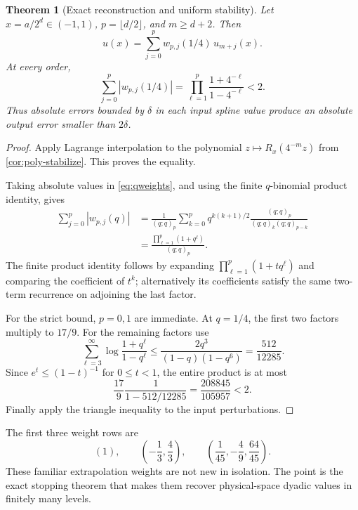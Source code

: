 \documentclass[11pt,a4paper]{article}
\numberwithin{equation}{section}
\newtheorem{theorem}{Theorem}[section]
\theoremstyle{definition}
\begin{document}
\begin{theorem}[Exact reconstruction and uniform stability]\label{thm:richardson}
Let $x=a/2^d\in(-1,1)$, $p=\lfloor d/2\rfloor$, and $m\geq d+2$.
Then
\begin{equation}
 \boxed{\quad u(x)=\sum_{j=0}^p w_{p,j}(1/4)\,u_{m+j}(x).\quad}
 \label{eq:exact-richardson}
\end{equation}
At every order,
\begin{equation}
 \sum_{j=0}^p|w_{p,j}(1/4)|
 =\prod_{\ell=1}^p\frac{1+4^{-\ell}}{1-4^{-\ell}}<2.
 \label{eq:stable-weights}
\end{equation}
Thus absolute errors bounded by $\delta$ in each input spline value
produce an absolute output error smaller than $2\delta$.
\end{theorem}
\begin{proof}
Apply Lagrange interpolation to the polynomial
$z\mapsto R_x(4^{-m}z)$ from \cref{cor:poly-stabilize}. This proves
the equality.

Taking absolute values in \eqref{eq:qweights}, and using the finite
$q$-binomial product identity, gives
\begin{align}
 \sum_{j=0}^p|w_{p,j}(q)|
 &=\frac1{(q;q)_p}\sum_{k=0}^p
      q^{k(k+1)/2}\frac{(q;q)_p}{(q;q)_k(q;q)_{p-k}}\nonumber\\
 &=\frac{\prod_{\ell=1}^p(1+q^\ell)}{(q;q)_p}.
 \label{eq:qnorm-proof}
\end{align}
The finite product identity follows by expanding
$\prod_{\ell=1}^p(1+tq^\ell)$ and comparing the coefficient of
$t^k$; alternatively its coefficients satisfy the same two-term
recurrence on adjoining the last factor.

For the strict bound, $p=0,1$ are immediate. At $q=1/4$, the first
two factors multiply to $17/9$. For the remaining factors use
\begin{equation}
 \sum_{\ell=3}^{\infty}\log\frac{1+q^\ell}{1-q^\ell}
 \leq\frac{2q^3}{(1-q)(1-q^6)}=\frac{512}{12285}.
\end{equation}
Since $e^t\leq(1-t)^{-1}$ for $0\leq t<1$, the entire product is
at most
\begin{equation}
 \frac{17}{9}\frac1{1-512/12285}
 =\frac{208845}{105957}<2.
\end{equation}
Finally apply the triangle inequality to the input perturbations.
\end{proof}

The first three weight rows are
\begin{equation}
 (1),\qquad
 \left(-\frac13,\frac43\right),\qquad
 \left(\frac1{45},-\frac49,\frac{64}{45}\right).
\end{equation}
These familiar extrapolation weights are not new in isolation.
The point is the exact stopping theorem that makes them recover
physical-space dyadic values in finitely many levels.
\end{document}
